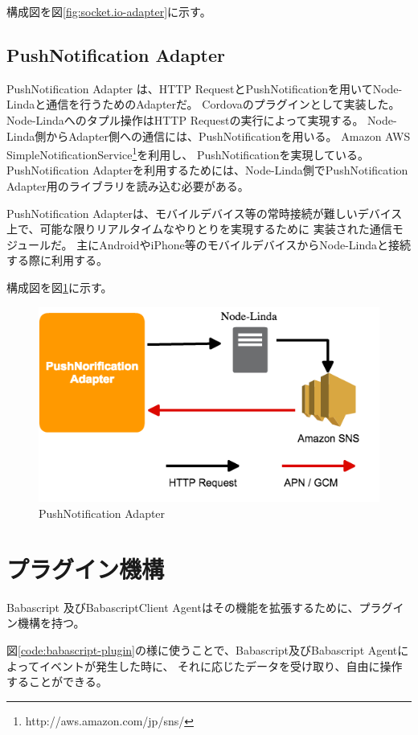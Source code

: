 構成図を図\ref{fig:socket.io-adapter}に示す。

\subsection{PushNotification Adapter}\label{pushnotification-adapter}

PushNotification Adapter は、HTTP
RequestとPushNotificationを用いてNode-Lindaと通信を行うためのAdapterだ。
Cordovaのプラグインとして実装した。 Node-Lindaへのタプル操作はHTTP
Requestの実行によって実現する。
Node-Linda側からAdapter側への通信には、PushNotificationを用いる。 Amazon
AWS
SimpleNotificationService\footnote{http://aws.amazon.com/jp/sns/}を利用し、
PushNotificationを実現している。 PushNotification
Adapterを利用するためには、Node-Linda側でPushNotification
Adapter用のライブラリを読み込む必要がある。

PushNotification
Adapterは、モバイルデバイス等の常時接続が難しいデバイス上で、可能な限りリアルタイムなやりとりを実現するために
実装された通信モジュールだ。
主にAndroidやiPhone等のモバイルデバイスからNode-Lindaと接続する際に利用する。

構成図を図\ref{fig:push-notification-adapter}に示す。

\begin{figure}[htbp]
  \begin{center}
  \includegraphics[width=.5\linewidth,bb=0 0 529 303]{images/push-notification-adapter.png}
  \end{center}
  \caption{PushNotification Adapter}
  \label{fig:push-notification-adapter}
\end{figure}

\section{プラグイン機構}\label{ux30d7ux30e9ux30b0ux30a4ux30f3ux6a5fux69cb}

Babascript 及びBabascriptClient
Agentはその機能を拡張するために、プラグイン機構を持つ。

図\ref{code:babascript-plugin}の様に使うことで、Babascript及びBabascript
Agentによってイベントが発生した時に、
それに応じたデータを受け取り、自由に操作することができる。

